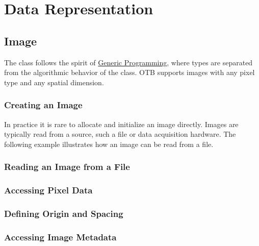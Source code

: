 \chapter{Data Representation}
\label{sec:DataRepresentation}

\section{Image}
\label{sec:ImageSection}

The  class follows the spirit of
\href{http://www.boost.org/more/generic_programming.html}{Generic
Programming}, where types are separated from the algorithmic behavior
of the class.  OTB supports images with any pixel type and any spatial
dimension.

\subsection{Creating an Image}\label{sec:CreatingAnImageSection}



In practice it is rare to allocate and initialize an image directly.
Images are typically read from a source, such a file or data acquisition
hardware. The following example illustrates how an image can be read from
a file.




\subsection{Reading an Image from a File}
\label{sec:ReadingImageFromFile}







\subsection{Accessing Pixel Data}
\label{sec:AccessingImagePixelData}






\subsection{Defining Origin and Spacing}
\label{sec:DefiningImageOriginAndSpacing}



\subsection{Accessing Image Metadata}
\label{sec:AccessingImageMetadata}



